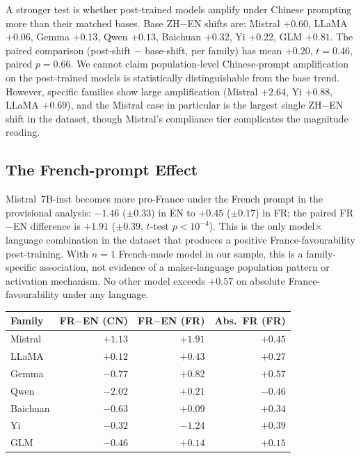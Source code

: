 \documentclass[letterpaper]{article}
\begin{document}
A stronger test is whether post-trained models amplify under Chinese prompting more than their matched bases. Base ZH$-$EN shifts are: Mistral $+0.60$, LLaMA $+0.06$, Gemma $+0.13$, Qwen $+0.13$, Baichuan $+0.32$, Yi $+0.22$, GLM $+0.81$. The paired comparison (post-shift $-$ base-shift, per family) has mean $+0.20$, $t = 0.46$, paired $p = 0.66$. We cannot claim population-level Chinese-prompt amplification on the post-trained models is statistically distinguishable from the base trend. However, specific families show large amplification (Mistral $+2.64$, Yi $+0.88$, LLaMA $+0.69$), and the Mistral case in particular is the largest single ZH$-$EN shift in the dataset, though Mistral's compliance tier complicates the magnitude reading.

\subsection{The French-prompt Effect}

Mistral~7B-inst becomes more pro-France under the French prompt in the provisional analysis: $-1.46$ ($\pm 0.33$) in EN to $+0.45$ ($\pm 0.17$) in FR; the paired FR$-$EN difference is $+1.91$ ($\pm 0.39$, $t$-test $p < 10^{-4}$). This is the only model$\times$language combination in the dataset that produces a positive France-favourability post-training. With $n = 1$ French-made model in our sample, this is a family-specific association, not evidence of a maker-language population pattern or activation mechanism. No other model exceeds $+0.57$ on absolute France-favourability under any language.

\begin{center}
\small
\setlength{\tabcolsep}{1mm}
\begin{tabular}{@{}l r r r@{}}
\toprule
Family & FR$-$EN (CN) & FR$-$EN (FR) & Abs.\ FR (FR) \\
\midrule
Mistral  & $+1.13$ & $\mathbf{+1.91}$ & $\mathbf{+0.45}$ \\
LLaMA    & $+0.12$ & $+0.43$          & $+0.27$ \\
Gemma    & $-0.77$ & $+0.82$          & $+0.57$ \\
Qwen     & $-2.02$ & $+0.21$          & $-0.46$ \\
Baichuan & $-0.63$ & $+0.09$          & $+0.34$ \\
Yi       & $-0.32$ & $-1.24$          & $+0.39$ \\
GLM      & $-0.46$ & $+0.14$          & $+0.15$ \\
\bottomrule
\end{tabular}
\end{center}
\end{document}
